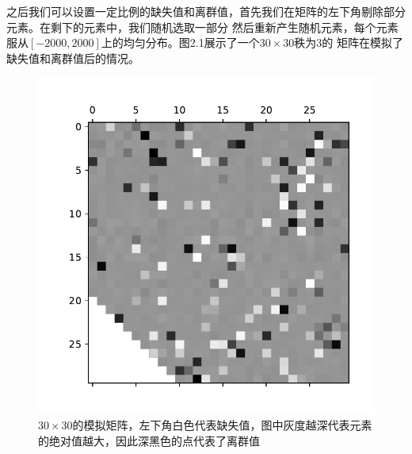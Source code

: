 之后我们可以设置一定比例的缺失值和离群值，首先我们在矩阵的左下角剔除部分元素。在剩下的元素中，我们随机选取一部分
然后重新产生随机元素，每个元素服从$[-2000,2000]$上的均匀分布。图2.1展示了一个$30\times30$秩为3的
矩阵在模拟了缺失值和离群值后的情况。

\begin{figure}[H]
    \centering
    \includegraphics[width=.5\textwidth]{pics/matrix.pdf}
    \caption{\small $30\times30$的模拟矩阵，左下角白色代表缺失值，图中灰度越深代表元素的绝对值越大，因此深黑色的点代表了离群值}
    \label{fig2.1}
\end{figure}